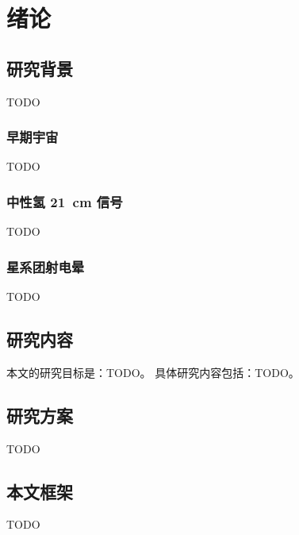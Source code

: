 \chapter{绪论}
\label{chap:introduction}

\section{研究背景}
\label{sec:background}

TODO

\subsection{早期宇宙}
\label{ssec:early-universe}

TODO

\subsection{中性氢 \SI{21}{\cm} 信号}
\label{ssec:21cm-signal}

TODO

\subsection{星系团射电晕}
\label{ssec:radio-halo}

TODO


\section{研究内容}
\label{sec:content}

本文的研究目标是：TODO。
具体研究内容包括：TODO。


\section{研究方案}
\label{sec:plan}

TODO


\section{本文框架}
\label{sec:structure}

TODO


